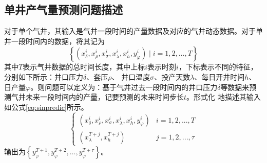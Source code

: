 \subsection{单井产气量预测问题描述}
对于单个气井，其输入是气井一段时间的产量数据及对应的气井动态数据。对于单井一段时间内的数据，将其记为
\begin{equation}
    \left\{ (x_{\delta}^i, x_{\rho}^i, x_{\sigma}^i, x_{\lambda}^i, x_{h}^i, y^i_{\varphi }) \mid i = 1, 2, \ldots, T \right\}
    \label{eq:singlewell}
\end{equation}
其中\( T \)表示气井数据的总时间长度，其中上标$i$表示时刻$i$，下标表示不同的特征，分别如下所示：井口压力\( \delta \)、套压\( \rho \)、
井口温度\( \sigma \)、投产天数\( \lambda \)、每日开井时间$h$、日产量$\varphi $。则问题可以定义为：基于气井过去一段时间内的井口压力\( \delta \)等数据来预测气井未来一段时间内的产量，记要预测的未来时间步长$t$。形式化
地描述其输入如公式\eqref{eq:sinpredic}所示。
\begin{equation}
    \left\{
    \begin{array}{ll}
    (x_{\delta}^i, x_{\rho}^i, x_{\sigma}^i, x_{\lambda}^i, x_{h}^i, y^i_{\varphi }) &  i = 1, 2, ..., T \\
    (x_{\lambda}^{T+j}, x_{h}^{T+j}) & j = 1, 2, ..., \tau
    \end{array}
    \right.
    \label{eq:sinpredic}
\end{equation}    
输出为$\left\{ y^{T+1}_{\varphi}, y^{T+2}_{\varphi}, \ldots, y^{T+\tau}_{\varphi} \right\}$。

